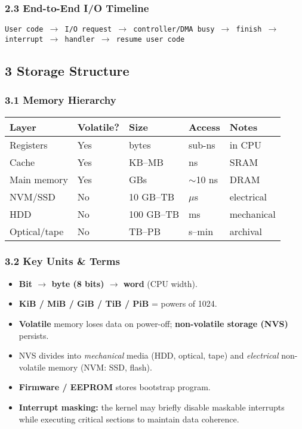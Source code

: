 \documentclass{article}
\begin{document}
\subsubsection*{2.3 End-to-End I/O Timeline}
\texttt{User code $\rightarrow$ I/O request $\rightarrow$ controller/DMA busy $\rightarrow$ finish $\rightarrow$ interrupt $\rightarrow$ handler $\rightarrow$ resume user code}

\subsection*{3 Storage Structure}
\subsubsection*{3.1 Memory Hierarchy}
\centering
\begin{tabular}{lllll}
\toprule
\textbf{Layer} & \textbf{Volatile?} & \textbf{Size} & \textbf{Access} & \textbf{Notes} \\
\midrule
Registers & Yes & bytes & sub-ns & in CPU \\
Cache & Yes & KB–MB & ns & SRAM \\
Main memory & Yes & GBs & $\sim$10 ns & DRAM \\
NVM/SSD & No & 10 GB–TB & $\mu$s & electrical \\
HDD & No & 100 GB–TB & ms & mechanical \\
Optical/tape & No & TB–PB & s–min & archival \\
\bottomrule
\end{tabular}
\vspace{\baselineskip}

\subsubsection*{3.2 Key Units \& Terms}
\begin{itemize}
    \item \textbf{Bit $\rightarrow$ byte (8 bits) $\rightarrow$ word} (CPU width).
    \item \textbf{KiB / MiB / GiB / TiB / PiB} = powers of 1024.
    \item \textbf{Volatile} memory loses data on power-off; \textbf{non-volatile storage (NVS)} persists.
    \item NVS divides into \emph{mechanical} media (HDD, optical, tape) and
      \emph{electrical} non-volatile memory (NVM: SSD, flash).

    \item \textbf{Firmware / EEPROM} stores bootstrap program.
    \item \textbf{Interrupt masking:} the kernel may briefly disable maskable
      interrupts while executing critical sections to maintain data coherence.

\end{itemize}
\end{document}
